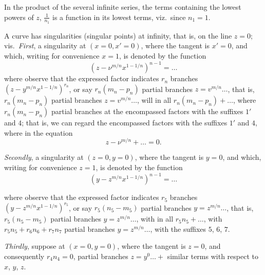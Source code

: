 \documentclass[12pt,a4paper,oneside]{book}
\theoremstyle{plain}
\theoremstyle{definition}
\theoremstyle{remark}
\begin{document}
In the product of the several infinite series, the terms containing the lowest powers of $z$, $\frac{1}{n_1}$ is a function in its lowest terms, viz.\ since $n_1=1$.

A curve has singularities (singular points) at infinity, that is, on the line $z=0$; vis.\
\textit{First}, a singularity at $(x=0, x'=0)$, where the tangent is $x'=0$, and which, writing for convenience $x=1$, is denoted by the function
\[
\left(z-\nu^{m/n}x^{1-1/n}\right)^{n-1}=\dots
\]
where observe that the expressed factor indicates $r_n$ branches $\left(z-y^{m/n}x^{1-1/n}\right)^{r_n}$, or say $r_n(m_n-p_n)$ partial branches $z=v^{m/n}\dots$, that is, $r_n(m_n-p_n)$ partial branches $z=v^{m/n}\dots$, will in all $r_n(m_n-p_n)+\dots$, where $r_n(m_n-p_n)$ partial branches at the encompassed factors with the suffixes $1'$ and $4$; that is, we can regard the encompassed factors with the suffixes $1'$ and $4$, where in the equation
\[
z-\nu^{m/n}+\dots=0.
\]

\textit{Secondly}, a singularity at $(z=0, y=0)$, where the tangent is $y=0$, and which, writing for convenience $z=1$, is denoted by the function
\[
\left(y-z^{m/n}x^{1-1/n}\right)^{n-1}=\dots
\]


\newpage
where observe that the expressed factor indicates $r_5$ branches $\left(y-z^{m/n}x^{1-1/n}\right)^{r_5}$, or say $r_5(n_5-m_5)$ partial branches $y=z^{m/n}\dots$, that is, $r_5(n_5-m_5)$ partial branches $y=z^{m/n}\dots$, with in all $r_5n_5+\dots$, with $r_5n_5+r_6n_6+r_7n_7$ partial branches $y=z^{m/n}\dots$, with the suffixes $5$, $6$, $7$.

\textit{Thirdly}, suppose at $(x=0, y=0)$, where the tangent is $z=0$, and consequently $r_4n_4=0$, partial branches $z=y^0\dots+$ similar terms with respect to $x$, $y$, $z$.
\end{document}
